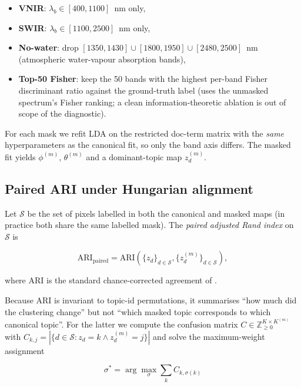 \documentclass[conference,a4paper,10pt]{IEEEtran}
\begin{document}
\begin{itemize}
\item \textbf{VNIR}: $\lambda_b \in [400, 1100]$~nm only,
\item \textbf{SWIR}: $\lambda_b \in [1100, 2500]$~nm only,
\item \textbf{No-water}: drop
$[1350, 1430] \cup [1800, 1950] \cup [2480, 2500]$~nm
(atmospheric water-vapour absorption bands),
\item \textbf{Top-50 Fisher}: keep the 50 bands with the highest
per-band Fisher discriminant ratio against the ground-truth label
(uses the unmasked spectrum's Fisher ranking; a clean
information-theoretic ablation is out of scope of the diagnostic).
\end{itemize}

For each mask we refit LDA on the restricted doc-term matrix with
the \emph{same} hyperparameters as the canonical fit, so only the
band axis differs. The masked fit yields $\phi^{(m)}$,
$\theta^{(m)}$ and a dominant-topic map $z^{(m)}_d$.

\subsection{Paired ARI under Hungarian alignment}

Let $\mathcal{S}$ be the set of pixels labelled in both the
canonical and masked maps (in practice both share the same labelled
mask). The \emph{paired adjusted Rand index} on $\mathcal{S}$ is

\begin{equation}
\text{ARI}_{\text{paired}} =
\text{ARI}\left( \{z_d\}_{d \in \mathcal{S}}, \{z^{(m)}_d\}_{d \in \mathcal{S}} \right),
\label{eq:paired-ari}
\end{equation}

\noindent where ARI is the standard chance-corrected agreement of
\cite{hubert1985ari,vinh2010information}.

Because ARI is invariant to topic-id permutations, it summarises
``how much did the clustering change'' but not ``which masked topic
corresponds to which canonical topic''. For the latter we compute
the confusion matrix $C \in \mathbb{Z}_{\ge 0}^{K \times K^{(m)}}$
with $C_{k, j} = |\{d \in \mathcal{S} : z_d = k \wedge z^{(m)}_d = j\}|$
and solve the maximum-weight assignment

\begin{equation}
\sigma^* = \arg\max_{\sigma} \sum_k C_{k, \sigma(k)}
\label{eq:hungarian}
\end{equation}
\end{document}
